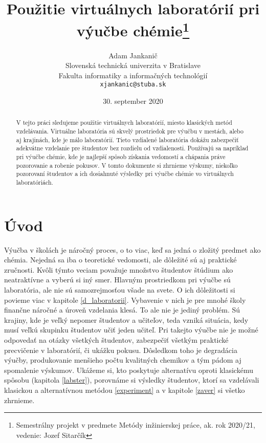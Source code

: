\documentclass[10pt,oneside,slovak,a4paper]{article}
\title{Použitie virtuálnych laboratórií pri výučbe chémie\thanks{Semestrálny projekt v predmete Metódy inžinierskej práce, ak. rok 2020/21, vedenie: Jozef Sitarčík}}
\author{Adam Jankanič\\[2pt]
	{\small Slovenská technická univerzita v Bratislave}\\
	{\small Fakulta informatiky a informačných technológií}\\
	{\small \texttt{xjankanic@stuba.sk}}
	}
\date{\small 30. september 2020} %
\begin{document}
\maketitle

\begin{abstract}
V tejto práci sledujeme použitie virtuálnych laboratórií, miesto klasických metód vzdelávania. Virtuálne laboratória sú skvelý prostriedok pre výučbu v mestách, alebo aj krajinách, kde je málo laboratórií. Tieto vzdialené laboratória dokážu zabezpečiť adekvátne vzdelanie pre študentov bez rozdielu od vzdialenosti. Používajú sa napríklad pri výučbe chémie, kde je najlepší spôsob získania vedomostí a chápania práve pozorovanie a robenie pokusov. V tomto dokumente si zhrnieme výskumy, niekoľko pozorovaní študentov a ich dosiahnuté výsledky pri výučbe chémie vo virtuálnych laboratóriách.
\end{abstract}



\section{Úvod}

Výučba v školách je náročný proces, o to viac, keď sa jedná o zložitý predmet ako chémia. Nejedná sa iba o teoretické vedomosti, ale dôležité sú aj praktické zručnosti. Kvôli týmto veciam považuje množstvo študentov štúdium ako neatraktívne a vyberú si iný smer. Hlavným prostriedkom pri výučbe sú laboratória, ale nie sú samozrejmosťou všade na svete. O ich dôležitosti si povieme viac v kapitole \ref{d_laboratorii}. Vybavenie v nich je pre mnohé školy finančne náročné a úroveň vzdelania klesá. To ale nie je jediný problém. Sú krajiny, kde je veľký nepomer študentov a učiteľov, teda vzniká situácia, kedy musí veľkú skupinku študentov učiť jeden učiteľ. Pri takejto výučbe nie je možné odpovedať na otázky všetkých študentov, zabezpečiť všetkým praktické precvičenie v laboratórií, či  ukážku pokusu. Dôsledkom toho je degradácia výučby, produkovanie menšieho počtu kvalitných chemikov a tým pádom aj spomalenie výskumov. Ukážeme si, kto poskytuje alternatívu oproti klasickému spôsobu (kapitola \ref{labster}), porovnáme si výsledky študentov, ktorí sa vzdelávali klasickou a alternatívnou metódou \ref{experiment} a v kapitole \ref{zaver} si všetko zhrnieme.
\end{document}
